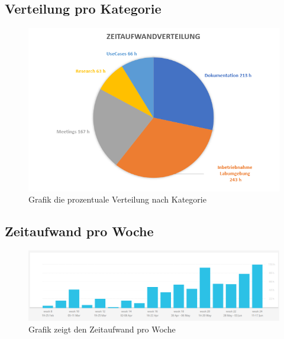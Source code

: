 \subsection{Verteilung pro Kategorie}
\begin{figure}[H]
	\centering
	\includegraphics[width=15cm]{img/zeitaufwand/zeitaufwandverteilung.PNG}
	\caption{Grafik die prozentuale Verteilung nach Kategorie}
	\label{fig:zeitmanagement-kategorie}
\end{figure} 

\subsection{Zeitaufwand pro Woche}
\begin{figure}[H]
	\centering
	\includegraphics[width=16cm]{img/zeitaufwand/zeitaufwand_monat.PNG}
	\caption{Grafik zeigt den Zeitaufwand pro Woche}
	\label{fig:zeitmanagement-zeit}
\end{figure} 